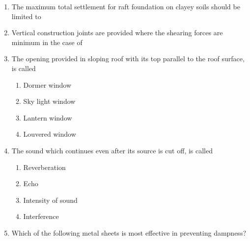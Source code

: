 \documentclass[11pt,a4paper]{article}
\begin{document}
\begin{enumerate}
\\\begin{enumerate*}[itemjoin=\qquad, label=\Alph*.]
\item{25 mm}
\item{40 mm}
\item{65 mm}
\item{100 mm}
\end{enumerate*}
\item{The maximum total settlement for raft foundation on clayey soils should be limited to}
\\
\item{Vertical construction joints are provided where the shearing forces are minimum in the case of}
\\
\item{The opening provided in sloping roof with its top parallel to the roof surface, is called}
\begin{enumerate}[label=\Alph*.]
\item{Dormer window}
\item{Sky light window}
\item{Lantern window}
\item{Louvered window}
\end{enumerate}
\item{The sound which continues even after its source is cut off, is called}
\begin{enumerate}[label=\Alph*.]
\item{Reverberation}
\item{Echo}
\item{Intensity of sound}
\item{Interference}
\end{enumerate}
\item{Which of the following metal sheets is most effective in preventing dampness?}

\end{enumerate}
\end{document}
